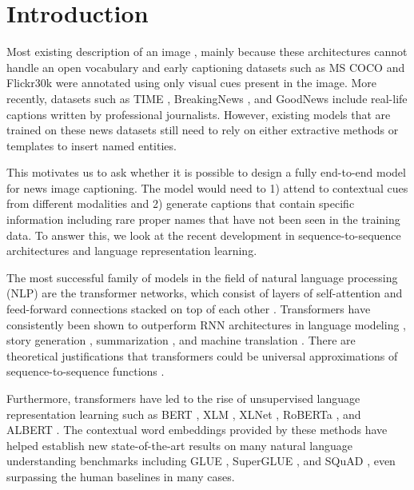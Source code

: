 
\section{Introduction}

Most existing  
 description
of an
image \cite{Donahue2015LongTR, Vinyals2015ShowAT, Fang2015FromCT,
Karpathy2015DeepVA, Rennie2017SelfCriticalST, Lu2017KnowingWT,
Anderson2017BottomUpAT, Cornia2019ShowCT}, mainly because these architectures
cannot handle an open vocabulary and early captioning datasets such as MS COCO
\cite{Lin2014MicrosoftCC, Chen2015MicrosoftCC} and Flickr30k
\cite{Young2014FromID} were annotated using only visual cues present in the
image. More recently, datasets such as TIME \cite{Tariq2017ACE}, BreakingNews
\cite{Ramisa2016BreakingNewsAA}, and GoodNews \cite{Biten2019GoodNews} include
real-life captions written by professional journalists. However, existing
models that are trained on these news datasets still need to rely on either
extractive methods or templates to insert named entities.

This motivates us to ask whether it is possible to design a fully end-to-end
model for news image captioning. The model would need to 1) attend to
contextual cues from different modalities and 2) generate captions that contain
specific information including rare proper names that have not been seen in the
training data. To answer this, we look at the recent development in
sequence-to-sequence architectures and language representation learning.

The most successful family of models in the field of natural language
processing (NLP) are the transformer networks, which consist of layers of
self-attention and feed-forward connections stacked on top of each other
\cite{Vaswani2017AttentionIA}. Transformers have consistently been shown to
outperform RNN architectures in language modeling \cite{Radford2019LanguageMA},
story generation \cite{Fan2018HierarchicalNS}, summarization
\cite{Subramanian2019OnEA}, and machine translation \cite{Bojar2018Findings}.
There are theoretical justifications that transformers could be universal
approximations of sequence-to-sequence functions \cite{Anonymous2020AreTU}.

Furthermore, transformers have led to the rise of unsupervised language
representation learning such as BERT \cite{Devlin2019BERT}, XLM
\cite{Lample2019CrosslingualLM}, XLNet \cite{Yang2019XLNetGA}, RoBERTa
\cite{Liu2019RoBERTaAR}, and ALBERT \cite{Lan2019ALBERT}. The contextual word
embeddings provided by these methods have helped establish new state-of-the-art
results on many natural language understanding benchmarks including GLUE
\cite{Wang2019GLUE}, SuperGLUE \cite{Wang2019SuperGLUEAS}, and SQuAD
\cite{Rajpurkar2016SQuAD, Rajpurkar2018KnowWY}, even surpassing the human
baselines in many cases.


